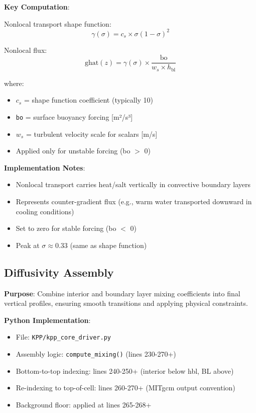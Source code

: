 \documentclass[11pt]{article}
\begin{document}
\textbf{Key Computation}:

Nonlocal transport shape function:
\begin{equation}
\gamma(\sigma) = c_s \times \sigma (1 - \sigma)^2
\end{equation}

Nonlocal flux:
\begin{equation}
\text{ghat}(z) = \gamma(\sigma) \times \frac{\text{bo}}{w_s \times h_{\text{bl}}}
\end{equation}

where:
\begin{itemize}
    \item $c_s$ = shape function coefficient (typically 10)
    \item \verb|bo| = surface buoyancy forcing [m²/s³]
    \item $w_s$ = turbulent velocity scale for scalars [m/s]
    \item Applied only for unstable forcing (bo $>$ 0)
\end{itemize}

\textbf{Implementation Notes}:
\begin{itemize}
    \item Nonlocal transport carries heat/salt vertically in convective boundary layers
    \item Represents counter-gradient flux (e.g., warm water transported downward in cooling conditions)
    \item Set to zero for stable forcing (bo $<$ 0)
    \item Peak at $\sigma \approx 0.33$ (same as shape function)
\end{itemize}

\subsection{Diffusivity Assembly}

\textbf{Purpose}: Combine interior and boundary layer mixing coefficients into final vertical profiles, ensuring smooth transitions and applying physical constraints.

\textbf{Python Implementation}:
\begin{itemize}
    \item File: \verb|KPP/kpp_core_driver.py|
    \item Assembly logic: \verb|compute_mixing()| (lines 230-270+)
    \item Bottom-to-top indexing: lines 240-250+ (interior below hbl, BL above)
    \item Re-indexing to top-of-cell: lines 260-270+ (MITgcm output convention)
    \item Background floor: applied at lines 265-268+
\end{itemize}
\end{document}
